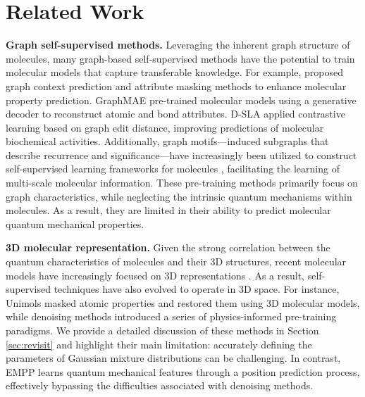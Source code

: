 \section{Related Work}
\vspace{-1em}
\textbf{Graph self-supervised methods.} Leveraging the inherent graph structure of molecules, many graph-based self-supervised methods have the potential to train molecular models that capture transferable knowledge. For example, \citet{hu2019strategies} proposed graph context prediction and attribute masking methods to enhance molecular property prediction. GraphMAE \citep{hou2022graphmae} pre-trained molecular models using a generative decoder to reconstruct atomic and bond attributes. D-SLA \citep{kim2022graph} applied contrastive learning based on graph edit distance, improving predictions of molecular biochemical activities. Additionally, graph motifs—induced subgraphs that describe recurrence and significance—have increasingly been utilized to construct self-supervised learning frameworks for molecules \citep{rong2020self,zhang2021motif,inae2023motif}, facilitating the learning of multi-scale molecular information. These pre-training methods primarily focus on graph characteristics, while neglecting the intrinsic quantum mechanisms within molecules. As a result, they are limited in their ability to predict molecular quantum mechanical properties. 



\textbf{3D molecular representation.} Given the strong correlation between the quantum characteristics of molecules and their 3D structures, recent molecular models have increasingly focused on 3D representations \citep{liao2023equiformer,passaro2023reducing,liao2024equiformerv}. As a result, self-supervised techniques have also evolved to operate in 3D space. For instance, Unimols \citep{zhou2023unimol,lu2023highly} masked atomic properties and restored them using 3D molecular models, while denoising methods \citep{zaidi2023pretraining,feng2023fractional} introduced a series of physics-informed pre-training paradigms. We provide a detailed discussion of these methods in Section \ref{sec:revisit} and highlight their main limitation: accurately defining the parameters of Gaussian mixture distributions can be challenging. In contrast, EMPP learns quantum mechanical features through a position prediction process, effectively bypassing the difficulties associated with denoising methods.


